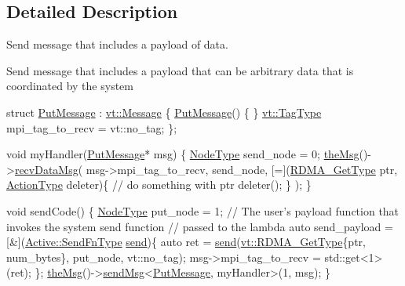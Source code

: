 \subsection{Detailed Description}
Send message that includes a payload of data. 

Send message that includes a payload that can be arbitrary data that is coordinated by the system


\begin{DoxyCode}
\textcolor{keyword}{struct }\hyperlink{namespacevt_1_1rdma_ae0a0330c647ec5ac5d508750f4cd4a06}{PutMessage} : \hyperlink{structvt_1_1messaging_1_1_active_msg}{vt::Message} \{
  \hyperlink{namespacevt_1_1rdma_ae0a0330c647ec5ac5d508750f4cd4a06}{PutMessage}() \{ \}
  \hyperlink{namespacevt_a84ab281dae04a52a4b243d6bf62d0e52}{vt::TagType} mpi\_tag\_to\_recv = vt::no\_tag;
\};

\textcolor{keywordtype}{void} myHandler(\hyperlink{namespacevt_1_1rdma_ae0a0330c647ec5ac5d508750f4cd4a06}{PutMessage}* msg) \{
  \hyperlink{namespacevt_a866da9d0efc19c0a1ce79e9e492f47e2}{NodeType} send\_node = 0;
  \hyperlink{namespacevt_aeafd31f866aeb4dc6fc2f6ee97136350}{theMsg}()->\hyperlink{structvt_1_1messaging_1_1_active_messenger_a33b2e3e047d0b1f6eb1398691f075b31}{recvDataMsg}(
    msg->mpi\_tag\_to\_recv, send\_node,
    [=](\hyperlink{namespacevt_a1cab7f4860f65a49ad2c042d6240f288}{RDMA\_GetType} ptr, \hyperlink{namespacevt_ae0a5a7b18cc99d7b732cb4d44f46b0f3}{ActionType} deleter)\{
       \textcolor{comment}{// do something with ptr}
       deleter();
    \}
  );
\}

\textcolor{keywordtype}{void} sendCode() \{
  \hyperlink{namespacevt_a866da9d0efc19c0a1ce79e9e492f47e2}{NodeType} put\_node = 1;
  \textcolor{comment}{// The user's payload function that invokes the system send function}
  \textcolor{comment}{// passed to the lambda}
  \textcolor{keyword}{auto} send\_payload = [&](\hyperlink{structvt_1_1messaging_1_1_active_messenger_a9821bc2d924729107f08fadf5a217537}{Active::SendFnType} \hyperlink{namespacevt_1_1objgroup_aa2e134493c6b8a23d7d5e86bd9df1a70}{send})\{
    \textcolor{keyword}{auto} ret = \hyperlink{namespacevt_1_1objgroup_aa2e134493c6b8a23d7d5e86bd9df1a70}{send}(\hyperlink{namespacevt_a1cab7f4860f65a49ad2c042d6240f288}{vt::RDMA\_GetType}\{ptr, num\_bytes\}, put\_node, vt::no\_tag);
    msg->mpi\_tag\_to\_recv = std::get<1>(ret);
  \};
  \hyperlink{namespacevt_aeafd31f866aeb4dc6fc2f6ee97136350}{theMsg}()->\hyperlink{group__preregister_ga55c6ea91181ae20c681e73a356750916}{sendMsg}<\hyperlink{namespacevt_1_1rdma_ae0a0330c647ec5ac5d508750f4cd4a06}{PutMessage}, myHandler>(1, msg);
\}
\end{DoxyCode}
 

